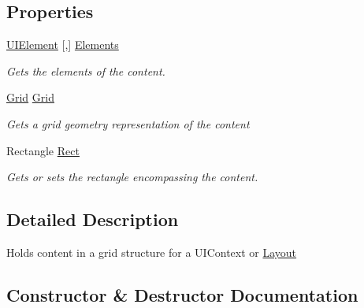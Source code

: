 \subsection*{Properties}
\begin{DoxyCompactItemize}
\item 
\hyperlink{class_m_b2_d_1_1_u_i_1_1_u_i_element}{U\+I\+Element} \mbox{[},\mbox{]} \hyperlink{class_m_b2_d_1_1_u_i_1_1_u_i_content_a9af3e2aaae3b3bd4de66403800b82b2e}{Elements}
\begin{DoxyCompactList}\small\item\em Gets the elements of the content. \end{DoxyCompactList}\item 
\hyperlink{class_m_b2_d_1_1_geometry_1_1_grid}{Grid} \hyperlink{class_m_b2_d_1_1_u_i_1_1_u_i_content_ad5593a2cc3e33f7094f1459bb3fc3f24}{Grid}
\begin{DoxyCompactList}\small\item\em Gets a grid geometry representation of the content \end{DoxyCompactList}\item 
Rectangle \hyperlink{class_m_b2_d_1_1_u_i_1_1_u_i_content_af2f7f9e8f8944afab658b3a1f2f94cd0}{Rect}
\begin{DoxyCompactList}\small\item\em Gets or sets the rectangle encompassing the content. \end{DoxyCompactList}\end{DoxyCompactItemize}


\subsection{Detailed Description}
Holds content in a grid structure for a U\+I\+Context or \hyperlink{class_m_b2_d_1_1_u_i_1_1_layout}{Layout} 



\subsection{Constructor \& Destructor Documentation}
\hypertarget{class_m_b2_d_1_1_u_i_1_1_u_i_content_a80e7f519af0f835fa9912ffa49d76e48}{}\label{class_m_b2_d_1_1_u_i_1_1_u_i_content_a80e7f519af0f835fa9912ffa49d76e48} 

